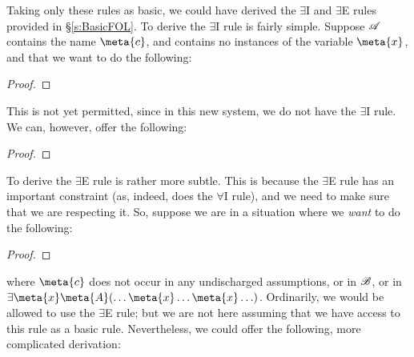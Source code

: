 Taking only these rules as basic, we could have derived the  $\exists$I and $\exists$E rules provided in \S\ref{s:BasicFOL}. To derive the $\exists$I rule is fairly simple. Suppose $\mathscr{A}$ contains the name $\meta{c}$, and contains no instances of the variable $\meta{x}$, and that we want to do the following:
\begin{proof}
\end{proof}
This is not yet permitted, since in this new system, we do not have the $\exists$I rule. We can, however, offer the following:
\begin{proof}
	\open
	\close
\end{proof}\noindent
To derive the $\exists$E rule is rather more subtle. This is because the $\exists$E rule has an important constraint (as, indeed, does the $\forall$I rule), and we need to make sure that we are respecting it. So, suppose we are in a situation where we \emph{want} to do the following:
\begin{proof}
	\open
	\close
\end{proof}\noindent
 where $\meta{c}$ does not occur in any undischarged assumptions, or in $\mathscr{B}$, or in $\exists \meta{x} \meta{A}(\ldots \meta{x} \ldots \meta{x}\ldots)$. Ordinarily, we would be allowed to use the $\exists$E rule; but we are not here assuming that we have access to this rule as a basic rule. Nevertheless, we could offer the following, more complicated derivation:
 
